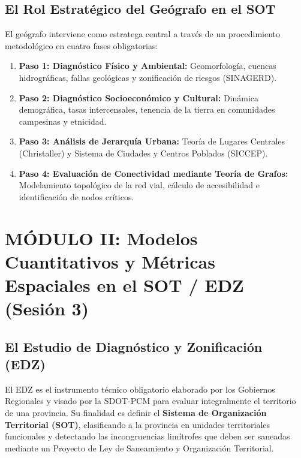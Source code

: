 \documentclass[11pt,a4paper]{article}
\begin{document}
\subsection{El Rol Estratégico del Geógrafo en el SOT}
El geógrafo interviene como estratega central a través de un procedimiento metodológico en cuatro fases obligatorias:
\begin{enumerate}
    \item \textbf{Paso 1: Diagnóstico Físico y Ambiental:} Geomorfología, cuencas hidrográficas, fallas geológicas y zonificación de riesgos (SINAGERD).
    \item \textbf{Paso 2: Diagnóstico Socioeconómico y Cultural:} Dinámica demográfica, tasas intercensales, tenencia de la tierra en comunidades campesinas y etnicidad.
    \item \textbf{Paso 3: Análisis de Jerarquía Urbana:} Teoría de Lugares Centrales (Christaller) y Sistema de Ciudades y Centros Poblados (SICCEP).
    \item \textbf{Paso 4: Evaluación de Conectividad mediante Teoría de Grafos:} Modelamiento topológico de la red vial, cálculo de accesibilidad e identificación de nodos críticos.
\end{enumerate}

\newpage
\section{MÓDULO II: Modelos Cuantitativos y Métricas Espaciales en el SOT / EDZ (Sesión 3)}

\subsection{El Estudio de Diagnóstico y Zonificación (EDZ)}
El EDZ es el instrumento técnico obligatorio elaborado por los Gobiernos Regionales y visado por la SDOT-PCM para evaluar integralmente el territorio de una provincia. Su finalidad es definir el \textbf{Sistema de Organización Territorial (SOT)}, clasificando a la provincia en unidades territoriales funcionales y detectando las incongruencias limítrofes que deben ser saneadas mediante un Proyecto de Ley de Saneamiento y Organización Territorial.
\end{document}
